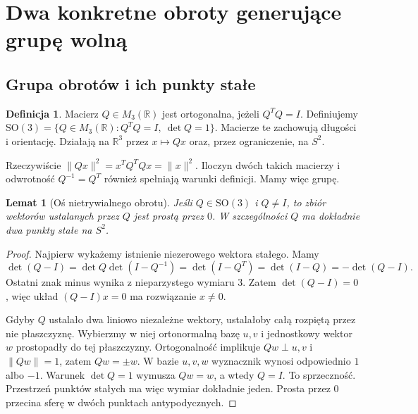 \documentclass[11pt,a4paper]{article}
\numberwithin{equation}{section}
\theoremstyle{plain}
\newtheorem{lemat}[twierdzenie]{Lemat}
\theoremstyle{definition}
\newtheorem{definicja}[twierdzenie]{Definicja}
\theoremstyle{remark}
\newcommand{\R}{\mathbb R}
\begin{document}
\section{Dwa konkretne obroty generujące grupę wolną}
\subsection{Grupa obrotów i ich punkty stałe}\label{subsec:so3}
\begin{definicja}
Macierz $Q\in M_3(\R)$ jest ortogonalna, jeżeli $Q^TQ=I$. Definiujemy $\mathrm{SO}(3)=\{Q\in M_3(\R):Q^TQ=I,\ \det Q=1\}$. Macierze te zachowują długości i orientację. Działają na $\R^3$ przez $x\mapsto Qx$ oraz, przez ograniczenie, na $S^2$.
\end{definicja}
Rzeczywiście $\|Qx\|^2=x^TQ^TQx=\|x\|^2$. Iloczyn dwóch takich macierzy i odwrotność $Q^{-1}=Q^T$ również spełniają warunki definicji. Mamy więc grupę.
\begin{lemat}[Oś nietrywialnego obrotu]\label{lem:os-obrotu}
Jeśli $Q\in\mathrm{SO}(3)$ i $Q\ne I$, to zbiór wektorów ustalanych przez $Q$ jest prostą przez $0$. W szczególności $Q$ ma dokładnie dwa punkty stałe na $S^2$.
\end{lemat}
\begin{proof}
Najpierw wykażemy istnienie niezerowego wektora stałego. Mamy
\[
 \det(Q-I)=\det Q\det(I-Q^{-1})=\det(I-Q^T)
 =\det(I-Q)=-\det(Q-I).
\]
Ostatni znak minus wynika z nieparzystego wymiaru $3$. Zatem $\det(Q-I)=0$, więc układ $(Q-I)x=0$ ma rozwiązanie $x\ne0$.

Gdyby $Q$ ustalało dwa liniowo niezależne wektory, ustalałoby całą rozpiętą przez nie płaszczyznę. Wybierzmy w niej ortonormalną bazę $u,v$ i jednostkowy wektor $w$ prostopadły do tej płaszczyzny. Ortogonalność implikuje $Qw\perp u,v$ i $\|Qw\|=1$, zatem $Qw=\pm w$. W bazie $u,v,w$ wyznacznik wynosi odpowiednio $1$ albo $-1$. Warunek $\det Q=1$ wymusza $Qw=w$, a wtedy $Q=I$. To sprzeczność. Przestrzeń punktów stałych ma więc wymiar dokładnie jeden. Prosta przez $0$ przecina sferę w dwóch punktach antypodycznych.
\end{proof}
\end{document}
